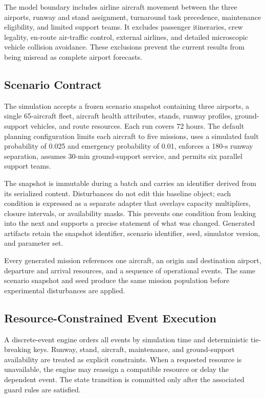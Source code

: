 \documentclass[runningheads]{llncs}
\begin{document}
The model boundary includes airline aircraft movement between the three airports, runway and stand assignment, turnaround task precedence, maintenance eligibility, and limited support teams. It excludes passenger itineraries, crew legality, en-route air-traffic control, external airlines, and detailed microscopic vehicle collision avoidance. These exclusions prevent the current results from being misread as complete airport forecasts.
\subsection{Scenario Contract}
The simulation accepts a frozen scenario snapshot containing three airports, a single 65-aircraft fleet, aircraft health attributes, stands, runway profiles, ground-support vehicles, and route resources. Each run covers 72 hours. The default planning configuration limits each aircraft to five missions, uses a simulated fault probability of 0.025 and emergency probability of 0.01, enforces a 180-s runway separation, assumes 30-min ground-support service, and permits six parallel support teams.

The snapshot is immutable during a batch and carries an identifier derived from its serialized content. Disturbances do not edit this baseline object; each condition is expressed as a separate adapter that overlays capacity multipliers, closure intervals, or availability masks. This prevents one condition from leaking into the next and supports a precise statement of what was changed. Generated artifacts retain the snapshot identifier, scenario identifier, seed, simulator version, and parameter set.

Every generated mission references one aircraft, an origin and destination airport, departure and arrival resources, and a sequence of operational events. The same scenario snapshot and seed produce the same mission population before experimental disturbances are applied.

\subsection{Resource-Constrained Event Execution}
A discrete-event engine orders all events by simulation time and deterministic tie-breaking keys. Runway, stand, aircraft, maintenance, and ground-support availability are treated as explicit constraints. When a requested resource is unavailable, the engine may reassign a compatible resource or delay the dependent event. The state transition is committed only after the associated guard rules are satisfied.
\end{document}
